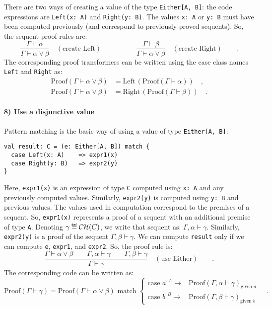 There are two ways of creating a value of the type \lstinline!Either[A, B]!:
the code expressions are \lstinline!Left(x: A)! and \lstinline!Right(y: B)!.
The values \lstinline!x: A! or \lstinline!y: B! must have been computed
previously (and correspond to previously proved sequents). So, the
sequent proof rules are:
\[
\frac{\Gamma\vdash\alpha}{\Gamma\vdash\alpha\vee\beta}\quad(\text{create Left})\quad\quad\quad\quad\quad\frac{\Gamma\vdash\beta}{\Gamma\vdash\alpha\vee\beta}\quad(\text{create Right})\quad\quad.
\]
The corresponding proof transformers can be written using the case
class names \lstinline!Left! and \lstinline!Right! as:
\begin{align*}
\text{Proof}\left(\Gamma\vdash\alpha\vee\beta\right) & =\text{Left}\,(\text{Proof}\left(\Gamma\vdash\alpha\right))\quad,\\
\text{Proof}\left(\Gamma\vdash\alpha\vee\beta\right) & =\text{Right}\,(\text{Proof}\left(\Gamma\vdash\beta\right))\quad.
\end{align*}


\paragraph{8) Use a disjunctive value}

Pattern matching is the basic way of using a value of type \lstinline!Either[A, B]!:
\begin{lstlisting}
val result: C = (e: Either[A, B]) match {
  case Left(x: A)    => expr1(x)
  case Right(y: B)   => expr2(y)
}
\end{lstlisting}
Here, \lstinline!expr1(x)! is an expression of type \lstinline!C!
computed using \lstinline!x: A! and any previously computed values.
Similarly, \lstinline!expr2(y)! is computed using \lstinline!y: B!
and previous values. The values used in computation correspond to
the premises of a sequent. So, \lstinline!expr1(x)! represents a
proof of a sequent with an additional premise of type \lstinline!A!.
Denoting $\gamma\triangleq{\cal CH}(C)$, we write that sequent as:
$\Gamma,\alpha\vdash\gamma$. Similarly, \lstinline!expr2(y)! is
a proof of the sequent $\Gamma,\beta\vdash\gamma$. We can compute
\lstinline!result! only if we can compute \lstinline!e!, \lstinline!expr1!,
and \lstinline!expr2!. So, the proof rule is: 
\[
\frac{\Gamma\vdash\alpha\vee\beta\quad\quad\Gamma,\alpha\vdash\gamma\quad\quad\Gamma,\beta\vdash\gamma}{\Gamma\vdash\gamma}\quad(\text{use Either})\quad\quad.
\]
The corresponding code can be written as:
\[
\text{Proof}\left(\Gamma\vdash\gamma\right)=\text{Proof}\left(\Gamma\vdash\alpha\vee\beta\right)\text{ match }\begin{cases}
\text{case }a^{:A}\rightarrow & \text{Proof}\left(\Gamma,\alpha\vdash\gamma\right)_{\text{given }a}\\
\text{case }b^{:B}\rightarrow & \text{Proof}\left(\Gamma,\beta\vdash\gamma\right)_{\text{given }b}
\end{cases}\quad.
\]

